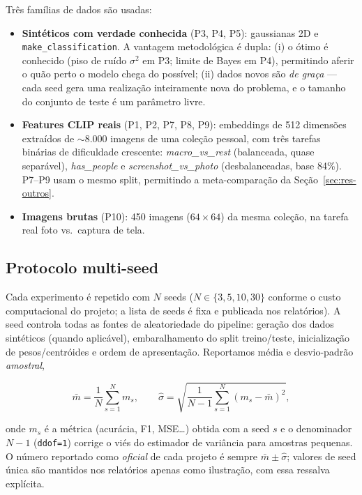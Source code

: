 \documentclass[12pt]{article}
\begin{document}
Três famílias de dados são usadas:

\begin{itemize}
  \item \textbf{Sintéticos com verdade conhecida} (P3, P4, P5): gaussianas 2D
        e \texttt{make\_classification}. A vantagem metodológica é dupla:
        (i) o ótimo é conhecido (piso de ruído $\sigma^2$ em P3; limite de
        Bayes em P4), permitindo aferir o quão perto o modelo chega do
        possível; (ii) dados novos são \emph{de graça} --- cada seed gera uma
        realização inteiramente nova do problema, e o tamanho do conjunto de
        teste é um parâmetro livre.
  \item \textbf{Features CLIP reais} (P1, P2, P7, P8, P9): embeddings de
        512 dimensões \cite{radford2021} extraídos de $\sim$8.000 imagens de
        uma coleção pessoal, com três tarefas binárias de dificuldade
        crescente: \emph{macro\_vs\_rest} (balanceada, quase separável),
        \emph{has\_people} e \emph{screenshot\_vs\_photo} (desbalanceadas,
        base 84\%). P7--P9 usam o mesmo split, permitindo a meta-comparação
        da Seção~\ref{sec:res-outros}.
  \item \textbf{Imagens brutas} (P10): 450 imagens ($64\times 64$) da mesma
        coleção, na tarefa real foto vs.\ captura de tela.
\end{itemize}

\subsection{Protocolo multi-seed}\label{sec:met-multiseed}

Cada experimento é repetido com $N$ seeds ($N \in \{3, 5, 10, 30\}$ conforme
o custo computacional do projeto; a lista de seeds é fixa e publicada nos
relatórios). A seed controla todas as fontes de aleatoriedade do pipeline:
geração dos dados sintéticos (quando aplicável), embaralhamento do split
treino/teste, inicialização de pesos/centróides e ordem de apresentação.
Reportamos média e desvio-padrão \emph{amostral},

\begin{equation}
  \bar{m} = \frac{1}{N}\sum_{s=1}^{N} m_s, \qquad
  \hat{\sigma} = \sqrt{\frac{1}{N-1}\sum_{s=1}^{N}(m_s - \bar{m})^2},
  \label{eq:multiseed}
\end{equation}

onde $m_s$ é a métrica (acurácia, F1, MSE\ldots) obtida com a seed $s$ e o
denominador $N-1$ (\texttt{ddof=1}) corrige o viés do estimador de variância
para amostras pequenas. O número reportado como \emph{oficial} de cada
projeto é sempre $\bar{m} \pm \hat{\sigma}$; valores de seed única são
mantidos nos relatórios apenas como ilustração, com essa ressalva explícita.
\end{document}
